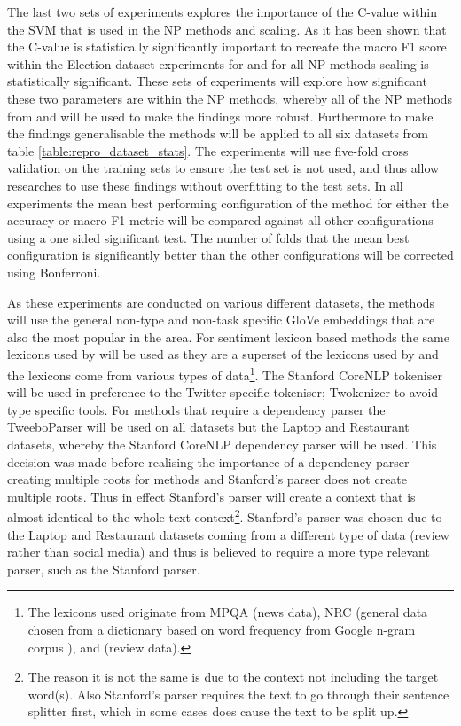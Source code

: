 The last two sets of experiments explores the importance of the C-value within the SVM that is used in the NP methods and scaling. As it has been shown that the C-value is statistically significantly important to recreate the macro F1 score within the Election dataset experiments for \citet{wang-etal-2017-tdparse} and for all NP methods scaling is statistically significant. These sets of experiments will explore how significant these two parameters are within the NP methods, whereby all of the NP methods from \citet{vo2015target} and \citet{wang-etal-2017-tdparse} will be used to make the findings more robust. Furthermore to make the findings generalisable the methods will be applied to all six datasets from table \ref{table:repro_dataset_stats}. The experiments will use five-fold cross validation on the training sets to ensure the test set is not used, and thus allow researches to use these findings without overfitting to the test sets. In all experiments the mean best performing configuration of the method for either the accuracy or macro F1 metric will be compared against all other configurations using a one sided significant test. The number of folds that the mean best configuration is significantly better than the other configurations will be corrected using Bonferroni. 

As these experiments are conducted on various different datasets, the methods will use the general non-type and non-task specific GloVe embeddings that are also the most popular in the area. For sentiment lexicon based methods the same lexicons used by \citet{wang-etal-2017-tdparse} will be used as they are a superset of the lexicons used by \citet{vo2015target} and the lexicons come from various types of data\footnote{The lexicons used originate from MPQA \citep{wilson-etal-2005-recognizing} (news data), NRC \citep{mohammad-turney-2010-emotions} (general data chosen from a dictionary based on word frequency from Google n-gram corpus \citep{brantsweb}), and \citet{hu2004mining} (review data).}. The Stanford CoreNLP tokeniser \citep{manning-etal-2014-stanford} will be used in preference to the Twitter specific tokeniser; Twokenizer \citep{gimpel-etal-2011-part} to avoid type specific tools. For \citet{wang-etal-2017-tdparse} methods that require a dependency parser the TweeboParser \citep{kong-etal-2014-dependency} will be used on all datasets but the Laptop and Restaurant datasets, whereby the Stanford CoreNLP dependency parser will be used. This decision was made before realising the importance of a dependency parser creating multiple roots for \citet{wang-etal-2017-tdparse} methods and Stanford's parser does not create multiple roots. Thus in effect Stanford's parser will create a context that is almost identical to the whole text context\footnote{The reason it is not the same is due to the context not including the target word(s). Also Stanford's parser requires the text to go through their sentence splitter first, which in some cases does cause the text to be split up.}. Stanford's parser was chosen due to the Laptop and Restaurant datasets coming from a different type of data (review rather than social media) and thus is believed to require a more type relevant parser, such as the Stanford parser. 

